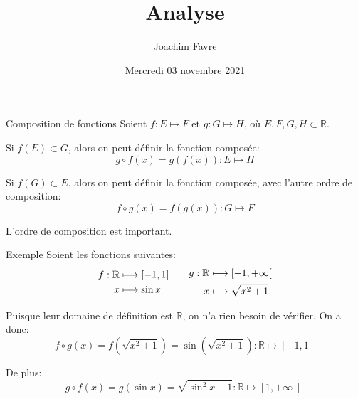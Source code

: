 \documentclass[a4paper]{article}
\title{Analyse}
\author{Joachim Favre}
\date{Mercredi 03 novembre 2021}
\begin{document}
\maketitle


\begin{parag}{Composition de fonctions}
    Soient $f: E \mapsto F$ et $g : G \mapsto H$, où $E, F, G, H \subset \mathbb{R}$.

    Si $f\left(E\right) \subset G$, alors on peut définir la fonction composée:
    \[g \circ f\left(x\right) = g\left(f\left(x\right)\right) : E \mapsto H\]

    Si $f\left(G\right) \subset E$, alors on peut définir la fonction composée, avec l'autre ordre de composition:
    \[f \circ g\left(x\right) = f\left(g\left(x\right)\right) : G \mapsto F\]

    L'ordre de composition est important.
\end{parag}

\begin{parag}{Exemple}
    Soient les fonctions suivantes:
    \[\begin{split}
        f: \mathbb{R} &\longmapsto \left[-1, 1\right]  \\
        x &\longmapsto \sin x
    \end{split}
    \mathspace
    \mathspace
    \begin{split}
        g: \mathbb{R} &\longmapsto \left[-1, +\infty\right[  \\
            x &\longmapsto \sqrt{x^2 + 1}
        \end{split}
    \]

    Puisque leur domaine de définition est $\mathbb{R}$, on n'a rien besoin de vérifier. On a donc:
    \[f \circ g\left(x\right) = f\left(\sqrt{x^2 + 1}\right) = \sin\left(\sqrt{x^2 + 1}\right) : \mathbb{R} \mapsto \left[-1, 1\right]\]

    De plus:
    \[g \circ f\left(x\right) = g\left(\sin x\right) = \sqrt{\sin^2 x + 1} : \mathbb{R} \mapsto \left[1, +\infty\right[ \]
\end{parag}
\end{document}

